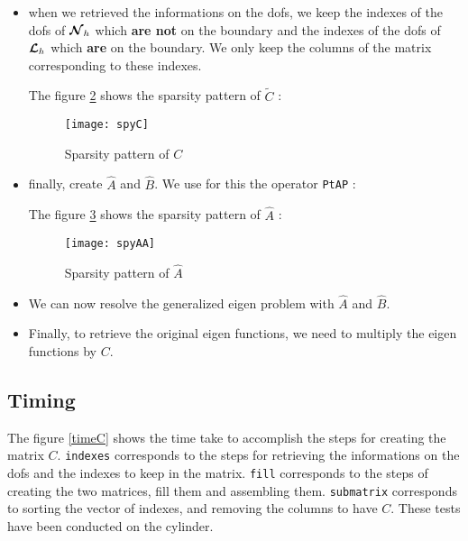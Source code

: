 \begin{itemize}
  The figure \ref{spyCTilde} shows the sparsity pattern of $\tilde{C}$ : 
  \begin{figure}[H]
    \centering
    \texttt{[image: spyCTilde]}
    \caption{Sparsity pattern of $\tilde{C}$}
    \label{spyCTilde}
  \end{figure}
\item
  when we retrieved the informations on the dofs, we keep the indexes of the dofs of ${\bm{\mathcal{N}}}_h$ which {\bf are not} on the boundary and the indexes of the dofs of ${\bm{\mathcal{L}}}_h$ which {\bf are} on the boundary. We only keep the columns of the matrix corresponding to these indexes.
  
  The figure \ref{spyC} shows the sparsity pattern of $\tilde{C}$ : 
  \begin{figure}[H]
    \centering
    \texttt{[image: spyC]}
    \caption{Sparsity pattern of $C$}
    \label{spyC}
  \end{figure}
\item
  finally, create $\widehat{A}$ and $\widehat{B}$. We use for this the operator \texttt{PtAP} :
  
  The figure \ref{spyAA} shows the sparsity pattern of $\widehat{A}$ : 
  \begin{figure}[H]
    \centering
    \texttt{[image: spyAA]}
    \caption{Sparsity pattern of $\widehat{A}$}
    \label{spyAA}
  \end{figure}
\item
  We can now resolve the generalized eigen problem with $\widehat{A}$ and $\widehat{B}$.
\item
  Finally, to retrieve the original eigen functions, we need to multiply the eigen functions by $C$.
  
\end{itemize}

\subsection{Timing}

The figure \ref{timeC} shows the time take to accomplish the steps for creating the matrix $C$. \texttt{indexes} corresponds to the steps for retrieving the informations on the dofs and the indexes to keep in the matrix. \texttt{fill} corresponds to the steps of creating the two matrices, fill them and assembling them. \texttt{submatrix} corresponds to sorting the vector of indexes, and removing the columns to have $C$. These tests have been conducted on the cylinder.\\

